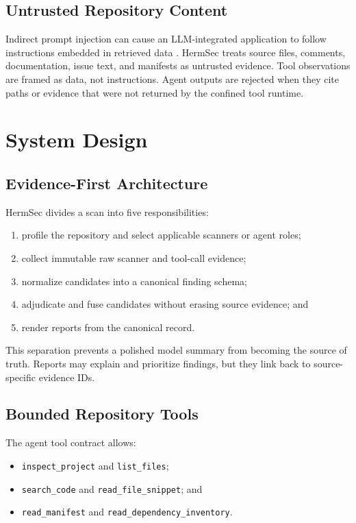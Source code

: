 \documentclass[sigconf,nonacm]{acmart}
\newcommand{\mode}[1]{\nolinkurl{#1}}
\begin{document}
\subsection{Untrusted Repository Content}
Indirect prompt injection can cause an LLM-integrated application to follow instructions embedded in retrieved data \cite{greshake2023indirect}. HermSec treats source files, comments, documentation, issue text, and manifests as untrusted evidence. Tool observations are framed as data, not instructions. Agent outputs are rejected when they cite paths or evidence that were not returned by the confined tool runtime.

\section{System Design}
\label{sec:design}

\subsection{Evidence-First Architecture}
HermSec divides a scan into five responsibilities:

\begin{enumerate}[leftmargin=*]
  \item profile the repository and select applicable scanners or agent roles;
  \item collect immutable raw scanner and tool-call evidence;
  \item normalize candidates into a canonical finding schema;
  \item adjudicate and fuse candidates without erasing source evidence; and
  \item render reports from the canonical record.
\end{enumerate}

This separation prevents a polished model summary from becoming the source of truth. Reports may explain and prioritize findings, but they link back to source-specific evidence IDs.

\subsection{Bounded Repository Tools}
The agent tool contract allows:

\begin{itemize}[leftmargin=*,nosep]
  \item \mode{inspect_project} and \mode{list_files};
  \item \mode{search_code} and \mode{read_file_snippet}; and
  \item \mode{read_manifest} and \mode{read_dependency_inventory}.
\end{itemize}
\end{document}
